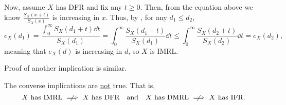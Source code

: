 \begin{enumerate}
\begin{pf}
Now, assume \(X\) has DFR and fix any \(t\ge 0\). Then, from the equation above
we know \(\displaystyle \frac{S_X(x+t)}{S_X(x)}\) is increasing in \(x\). Thus,
by , for any \(d_1\le d_2\),
\[
e_X(d_1)=\frac{\displaystyle \int_{0}^{\infty}S_X(d_1+t)\dd{t}}{S_X(d_1)}
=\int_{0}^{\infty}\frac{S_X(d_1+t)}{S_X(d_1)}\dd{t}
\le \int_{0}^{\infty}\frac{S_X(d_2+t)}{S_X(d_2)}\dd{t}
=e_X(d_2),
\]
meaning that \(e_X(d)\) is increasing in \(d\), so \(X\) is IMRL.

Proof of another implication is similar.
\end{pf}

\begin{warning}
The converse implications are \underline{not} true. That is,
\[
\text{\(X\) has IMRL \(\centernot\implies\) \(X\) has DFR}
\qqtext{and}
\text{\(X\) has DMRL \(\centernot\implies\) \(X\) has IFR}.
\]
\end{warning}
\end{enumerate}
